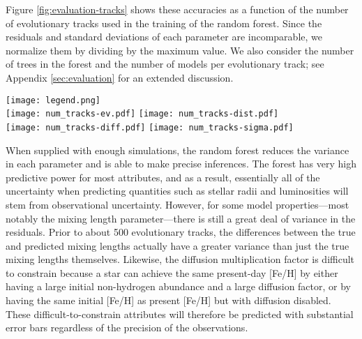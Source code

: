 \documentclass[manuscript,linenumbers]{aastex6}
\begin{document}
Figure \ref{fig:evaluation-tracks} shows these accuracies as a function of the number of evolutionary tracks used in the training of the random forest. Since the residuals and standard deviations of each parameter are incomparable, we normalize them by dividing by the maximum value. %
We also consider the number of trees in the forest and the number of models per evolutionary track; see Appendix \ref{sec:evaluation} for an extended discussion.

\begin{figure*}
    \centering
    \texttt{[image: legend.png]}\\
    \texttt{[image: num\_tracks-ev.pdf]}\hfill
    \texttt{[image: num\_tracks-dist.pdf]}\\
    \texttt{[image: num\_tracks-diff.pdf]}\hfill
    \texttt{[image: num\_tracks-sigma.pdf]}\\
    \caption{Evaluations of regression accuracy. Explained variance (top left), accuracy per precision distance (top right), normalized absolute error (bottom left), and normalized uncertainty (bottom right) for each stellar parameter as a function of the number of evolutionary tracks used in training the random forest. These results use 64 models per track and 256 trees in the random forest. } 
    \label{fig:evaluation-tracks}
\end{figure*}

When supplied with enough simulations, the random forest reduces the variance in each parameter and is able to make precise inferences. The forest has very high predictive power for most attributes, and as a result, essentially all of the uncertainty when predicting quantities such as stellar radii and luminosities will stem from observational uncertainty. However, for some model properties---most notably the mixing length parameter---there is still a great deal of variance in the residuals. Prior to about 500 evolutionary tracks, the differences between the true and predicted mixing lengths actually have a greater variance than just the true mixing lengths themselves. Likewise, the diffusion multiplication factor is difficult to constrain because a star can achieve the same present-day [Fe/H] by either having a large initial non-hydrogen abundance and a large diffusion factor, or by having the same initial [Fe/H] as present [Fe/H] but with diffusion disabled. These difficult-to-constrain attributes will therefore be predicted with substantial error bars regardless of the precision of the observations. 
\end{document}
